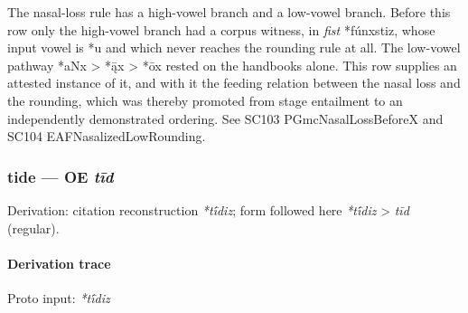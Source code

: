 \documentclass[
  british,
  a4paper,
]{article}
\begin{document}
The nasal-loss rule has a high-vowel branch and a low-vowel branch.
Before this row only the high-vowel branch had a corpus witness, in
\emph{fist} *fúnxstiz, whose input vowel is *u and which never reaches
the rounding rule at all. The low-vowel pathway *aNx \textgreater{} *ą̄x
\textgreater{} *ōx rested on the handbooks alone. This row supplies an
attested instance of it, and with it the feeding relation between the
nasal loss and the rounding, which was thereby promoted from stage
entailment to an independently demonstrated ordering. See SC103
PGmcNasalLossBeforeX and SC104 EAFNasalizedLowRounding.

\subsubsection{\texorpdfstring{tide --- OE
\emph{tīd}}{tide --- OE tīd}}\label{tide-oe-tux12bd}

Derivation: citation reconstruction \emph{*tī́diz}; form followed here
\emph{*tī́diz} \textgreater{} \emph{tīd} (regular).

\paragraph{Derivation trace}\label{derivation-trace-86}

Proto input: \emph{*tī́diz}

\begingroup
\setlength{\fboxsep}{6pt}
\end{document}
